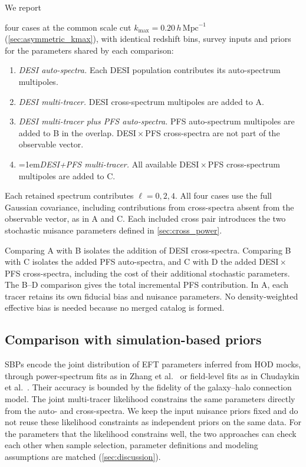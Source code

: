 \documentclass[a4paper,11pt]{article}
\newcommand{\revchange}[1]{{\color{RevisionColor}#1}}
\renewcommand{\emph}[1]{\textit{#1}}
\def\iMpch{\,h\,\mathrm{Mpc}^{-1}}
\def\kmax{k_{\mathrm{max}}}
\begin{document}
We report \revchange{four cases at the common scale cut
$\kmax=0.20\iMpch$ (\cref{sec:asymmetric_kmax}), with identical redshift bins, survey
inputs and priors for the parameters shared by each comparison:
\begin{enumerate}
\item[(A)] \emph{DESI auto-spectra.} Each DESI
population contributes its auto-spectrum multipoles.
\item[(B)] \emph{DESI multi-tracer.} DESI cross-spectrum
multipoles are added to A.
\item[(C)] \emph{DESI multi-tracer plus PFS auto-spectra.}
PFS auto-spectrum multipoles are added to B in the overlap.
DESI\,$\times$\,PFS cross-spectra are not part of the observable vector.
\item[(D)] \emergencystretch=1em\relax\emph{DESI+PFS multi-tracer.} All available
DESI\,$\times$\,PFS cross-spectrum multipoles are added to C.
\end{enumerate}
Each retained spectrum contributes $\ell=0,2,4$.
All four cases use the full Gaussian covariance, including contributions
from cross-spectra absent from the observable vector, as in A and C. Each included cross pair introduces the two
stochastic nuisance parameters defined in
\cref{sec:cross_power}.

Comparing A with B isolates the
addition of DESI cross-spectra. Comparing B with C isolates
the added PFS auto-spectra, and C with D the added
DESI\,$\times$\,PFS cross-spectra, including the cost of their
additional stochastic parameters. The B--D comparison gives the total incremental PFS contribution.
In A, each tracer retains its own fiducial bias and
nuisance parameters. No density-weighted effective bias is
needed because no merged catalog is formed.}


\subsection{Comparison with simulation-based priors}
\label{sec:sbp_comparison}

\revchange{SBPs encode the joint distribution of EFT parameters inferred
from HOD mocks, through power-spectrum fits as in
Zhang et al.~\cite{Zhang:2024thl} or field-level fits as in
Chudaykin et al.~\cite{Chudaykin:2026nls}. Their} accuracy is bounded
by the fidelity of the galaxy--halo connection model.
\revchange{The joint multi-tracer likelihood constrains the same parameters
directly from the auto- and cross-spectra.
We keep the input nuisance priors fixed and do not reuse these likelihood
constraints as independent priors on the same data.
For the parameters that the likelihood constrains well, the two approaches
can check each other when sample selection, parameter definitions and
modeling assumptions are matched (\cref{sec:discussion}).}
\end{document}
